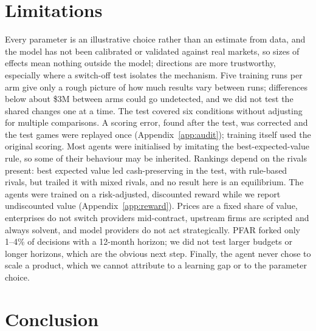 \documentclass[11pt]{article}
\begin{document}
\section{Limitations}
\label{sec:limitations}

Every parameter is an illustrative choice rather than an estimate from data, and the model has not been calibrated or validated against real markets, so sizes of effects mean nothing outside the model; directions are more trustworthy, especially where a switch-off test isolates the mechanism. Five training runs per arm give only a rough picture of how much results vary between runs; differences below about \$3M between arms could go undetected, and we did not test the shared changes one at a time. The test covered six conditions without adjusting for multiple comparisons. A scoring error, found after the test, was corrected and the test games were replayed once (Appendix~\ref{app:audit}); training itself used the original scoring. Most agents were initialised by imitating the best-expected-value rule, so some of their behaviour may be inherited. Rankings depend on the rivals present: best expected value led cash-preserving in the test, with rule-based rivals, but trailed it with mixed rivals, and no result here is an equilibrium. The agents were trained on a risk-adjusted, discounted reward while we report undiscounted value (Appendix~\ref{app:reward}). Prices are a fixed share of value, enterprises do not switch providers mid-contract, upstream firms are scripted and always solvent, and model providers do not act strategically. PFAR forked only 1--4\% of decisions with a 12-month horizon; we did not test larger budgets or longer horizons, which are the obvious next step. Finally, the agent never chose to scale a product, which we cannot attribute to a learning gap or to the parameter choice.

\section{Conclusion}
\end{document}
